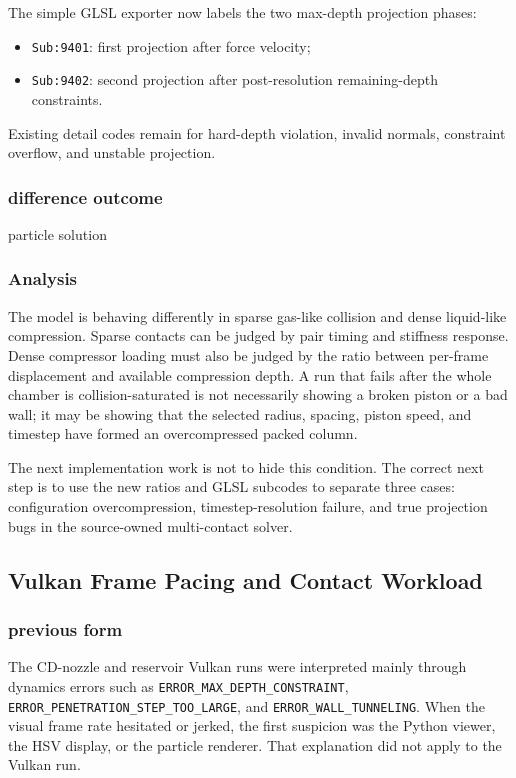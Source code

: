 The simple GLSL exporter now labels the two max-depth projection phases:
\begin{itemize}
    \item \texttt{Sub:9401}: first projection after force velocity;
    \item \texttt{Sub:9402}: second projection after post-resolution
          remaining-depth constraints.
\end{itemize}
Existing detail codes remain for hard-depth violation, invalid normals,
constraint overflow, and unstable projection.

\subsubsection{difference outcome}

particle solution

\subsubsection{Analysis}

The model is behaving differently in sparse gas-like collision and dense
liquid-like compression.  Sparse contacts can be judged by pair timing and
stiffness response.  Dense compressor loading must also be judged by the
ratio between per-frame displacement and available compression depth.  A run
that fails after the whole chamber is collision-saturated is not necessarily
showing a broken piston or a bad wall; it may be showing that the selected
radius, spacing, piston speed, and timestep have formed an overcompressed
packed column.

The next implementation work is not to hide this condition.  The correct
next step is to use the new ratios and GLSL subcodes to separate three cases:
configuration overcompression, timestep-resolution failure, and true
projection bugs in the source-owned multi-contact solver.

\subsection{Vulkan Frame Pacing and Contact Workload}

\subsubsection{previous form}

The CD-nozzle and reservoir Vulkan runs were interpreted mainly through
dynamics errors such as \texttt{ERROR\_MAX\_DEPTH\_CONSTRAINT},
\texttt{ERROR\_PENETRATION\_STEP\_TOO\_LARGE}, and
\texttt{ERROR\_WALL\_TUNNELING}.  When the visual frame rate hesitated or
jerked, the first suspicion was the Python viewer, the HSV display, or the
particle renderer.  That explanation did not apply to the Vulkan run.

